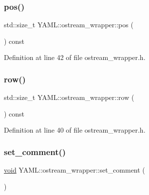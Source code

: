 \mbox{\label{class_y_a_m_l_1_1ostream__wrapper_a4a42954da9d63544e57e37400ad40280}} 
\subsubsection{\texorpdfstring{pos()}{pos()}}
{\footnotesize\ttfamily std\+::size\+\_\+t Y\+A\+M\+L\+::ostream\+\_\+wrapper\+::pos (\begin{DoxyParamCaption}{ }\end{DoxyParamCaption}) const\hspace{0.3cm}{\ttfamily [inline]}}



Definition at line 42 of file ostream\+\_\+wrapper.\+h.

\mbox{\label{class_y_a_m_l_1_1ostream__wrapper_a80e715ec84df28b7e6b03c005bfe4b5e}} 
\subsubsection{\texorpdfstring{row()}{row()}}
{\footnotesize\ttfamily std\+::size\+\_\+t Y\+A\+M\+L\+::ostream\+\_\+wrapper\+::row (\begin{DoxyParamCaption}{ }\end{DoxyParamCaption}) const\hspace{0.3cm}{\ttfamily [inline]}}



Definition at line 40 of file ostream\+\_\+wrapper.\+h.

\mbox{\label{class_y_a_m_l_1_1ostream__wrapper_a915ba192b32d05342619531e626b7580}} 
\subsubsection{\texorpdfstring{set\_comment()}{set\_comment()}}
{\footnotesize\ttfamily \mbox{\hyperlink{glad_8h_a950fc91edb4504f62f1c577bf4727c29}{void}} Y\+A\+M\+L\+::ostream\+\_\+wrapper\+::set\+\_\+comment (\begin{DoxyParamCaption}{ }\end{DoxyParamCaption})\hspace{0.3cm}{\ttfamily [inline]}}




